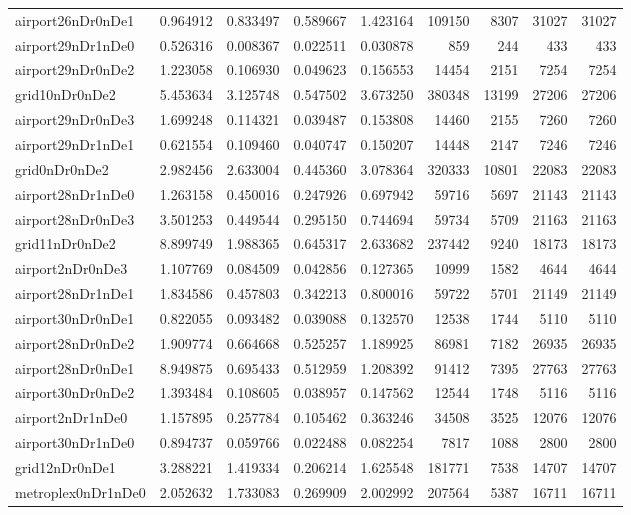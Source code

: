 \begin{longtable}{|l|r|r|r|r|r|r|r|r|}
airport26nDr0nDe1 & 0.964912 & 0.833497 & 0.589667 & 1.423164 & 109150 & 8307 & 31027 & 31027 \\
airport29nDr1nDe0 & 0.526316 & 0.008367 & 0.022511 & 0.030878 & 859 & 244 & 433 & 433 \\
airport29nDr0nDe2 & 1.223058 & 0.106930 & 0.049623 & 0.156553 & 14454 & 2151 & 7254 & 7254 \\
grid10nDr0nDe2 & 5.453634 & 3.125748 & 0.547502 & 3.673250 & 380348 & 13199 & 27206 & 27206 \\
airport29nDr0nDe3 & 1.699248 & 0.114321 & 0.039487 & 0.153808 & 14460 & 2155 & 7260 & 7260 \\
airport29nDr1nDe1 & 0.621554 & 0.109460 & 0.040747 & 0.150207 & 14448 & 2147 & 7246 & 7246 \\
grid0nDr0nDe2 & 2.982456 & 2.633004 & 0.445360 & 3.078364 & 320333 & 10801 & 22083 & 22083 \\
airport28nDr1nDe0 & 1.263158 & 0.450016 & 0.247926 & 0.697942 & 59716 & 5697 & 21143 & 21143 \\
airport28nDr0nDe3 & 3.501253 & 0.449544 & 0.295150 & 0.744694 & 59734 & 5709 & 21163 & 21163 \\
grid11nDr0nDe2 & 8.899749 & 1.988365 & 0.645317 & 2.633682 & 237442 & 9240 & 18173 & 18173 \\
airport2nDr0nDe3 & 1.107769 & 0.084509 & 0.042856 & 0.127365 & 10999 & 1582 & 4644 & 4644 \\
airport28nDr1nDe1 & 1.834586 & 0.457803 & 0.342213 & 0.800016 & 59722 & 5701 & 21149 & 21149 \\
airport30nDr0nDe1 & 0.822055 & 0.093482 & 0.039088 & 0.132570 & 12538 & 1744 & 5110 & 5110 \\
airport28nDr0nDe2 & 1.909774 & 0.664668 & 0.525257 & 1.189925 & 86981 & 7182 & 26935 & 26935 \\
airport28nDr0nDe1 & 8.949875 & 0.695433 & 0.512959 & 1.208392 & 91412 & 7395 & 27763 & 27763 \\
airport30nDr0nDe2 & 1.393484 & 0.108605 & 0.038957 & 0.147562 & 12544 & 1748 & 5116 & 5116 \\
airport2nDr1nDe0 & 1.157895 & 0.257784 & 0.105462 & 0.363246 & 34508 & 3525 & 12076 & 12076 \\
airport30nDr1nDe0 & 0.894737 & 0.059766 & 0.022488 & 0.082254 & 7817 & 1088 & 2800 & 2800 \\
grid12nDr0nDe1 & 3.288221 & 1.419334 & 0.206214 & 1.625548 & 181771 & 7538 & 14707 & 14707 \\
metroplex0nDr1nDe0 & 2.052632 & 1.733083 & 0.269909 & 2.002992 & 207564 & 5387 & 16711 & 16711 \\

\end{longtable}
